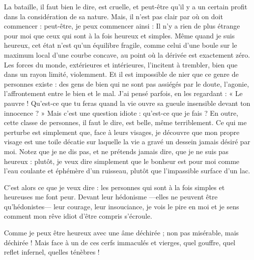 \documentclass[a4paper, 12pt]{article}
\begin{document}
La bataille, il faut bien le dire, est cruelle, et peut-être qu'il y a un
certain profit dans la considération de sa nature. Mais, il n'est pas
clair par où on doit commencer : peut-être, je peux commencer ainsi : Il n'y a
rien de plus étrange pour moi que ceux qui sont à la fois heureux et simples.
Même quand je suis heureux, cet état n'est qu'un équilibre fragile, comme
celui d'une boule sur le maximum local d'une courbe concave, au point où la
dérivée est exactement zéro. Les forces du monde, extérieures et intérieures,
l'incitent à trembler, bien que dans un rayon limité, violemment. Et il est
impossible de nier que ce genre de personnes existe : des gens de bien qui
ne sont pas assiégés par le doute, l'agonie, l'affrontement entre le bien et le
mal. J'ai pensé parfois, en les regardant : « Le pauvre ! Qu'est-ce que tu feras
quand la vie ouvre sa gueule insensible devant ton innocence ? » Mais c'est une
question idiote : qu'est-ce que je fais ? En outre, cette classe de personnes, il
faut le dire, est belle, même terriblement. Ce qui me perturbe est simplement
que, face à leurs visages, je découvre que mon propre visage est une toile
décatie sur laquelle la vie a gravé un dessein jamais désiré par moi. 
Notez que je ne dis pas, et ne prétends jamais dire, que je ne suis pas heureux :
plutôt, je veux dire simplement que le bonheur est pour moi comme l'eau coulante
et éphémère d'un ruisseau, plutôt que l'impassible surface d'un lac. 

C'est alors ce que je veux dire : 
les personnes qui sont à la fois simples et heureuses me font peur. Devant leur hédonisme ---elles ne peuvent être
qu'hédonistes--- leur courage, leur insouciance, je vois le pire en moi
et je sens comment mon rêve idiot d'être compris s'écroule.

Comme je peux être heureux avec une âme déchirée ; non pas misérable, mais
déchirée ! Mais face à un de ces cerfs immaculés et vierges, quel gouffre,
quel reflet infernel, quelles ténèbres !
\end{document}

